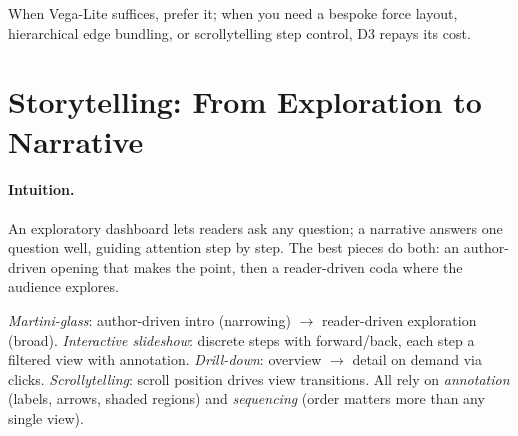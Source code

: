 When Vega-Lite suffices, prefer it; when you need a bespoke force layout, hierarchical edge bundling, or scrollytelling step control, D3 repays its cost.

\section{Storytelling: From Exploration to Narrative}
\label{sec:storytelling}
\paragraph{Intuition.} An exploratory dashboard lets readers ask any question; a narrative answers one question well, guiding attention step by step. The best pieces do both: an author-driven opening that makes the point, then a reader-driven coda where the audience explores.

\begin{definition}\label{def:narrative}
\emph{Martini-glass}: author-driven intro (narrowing) $\to$ reader-driven exploration (broad). \emph{Interactive slideshow}: discrete steps with forward/back, each step a filtered view with annotation. \emph{Drill-down}: overview $\to$ detail on demand via clicks. \emph{Scrollytelling}: scroll position drives view transitions. All rely on \emph{annotation} (labels, arrows, shaded regions) and \emph{sequencing} (order matters more than any single view).
\end{definition}

